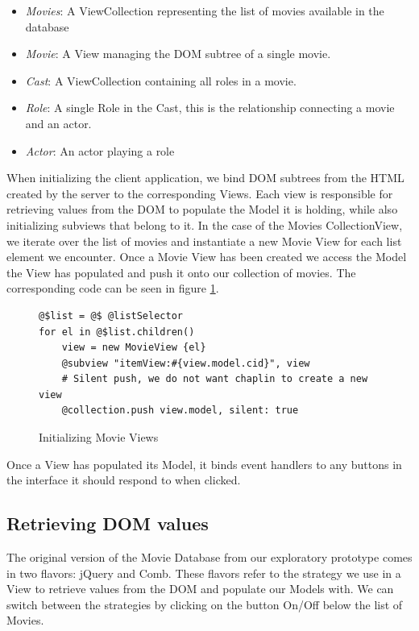 \documentclass[thesis.tex]{subfiles}
\begin{document}
\begin{itemize}
\item \emph{Movies}: A ViewCollection representing the list of movies available
                     in the database
\item \emph{Movie}: A View managing the DOM subtree of a single movie.
\item \emph{Cast}: A ViewCollection containing all roles in a movie.
\item \emph{Role}: A single Role in the Cast, this is the relationship
                   connecting a movie and an actor.
\item \emph{Actor}: An actor playing a role
\end{itemize}

When initializing the client application, we bind DOM subtrees from the HTML
created by the server to the corresponding Views. Each view is responsible for
retrieving values from the DOM to populate the Model it is holding, while also
initializing subviews that belong to it.
In the case of the Movies CollectionView, we iterate over the list of movies and
instantiate a new Movie View for each list element we encounter.
Once a Movie View has been created we access the Model the View has populated
and push it onto our collection of movies. The corresponding code can be seen in
figure \ref{fig:movies-iter}.
\begin{figure}
	\centering
	\begin{lstlisting}
@$list = @$ @listSelector
for el in @$list.children()
	view = new MovieView {el}
	@subview "itemView:#{view.model.cid}", view
	# Silent push, we do not want chaplin to create a new view
	@collection.push view.model, silent: true
	\end{lstlisting}
	\caption{Initializing Movie Views}
	\label{fig:movies-iter}
\end{figure}

Once a View has populated its Model, it binds event handlers to any buttons
in the interface it should respond to when clicked.

\subsection{Retrieving DOM values}
The original version of the Movie Database from our exploratory prototype comes
in two flavors: jQuery and Comb.
These flavors refer to the strategy we use in a View to retrieve values from the
DOM and populate our Models with. We can switch between the strategies by
clicking on the button On/Off below the list of Movies.
\end{document}
